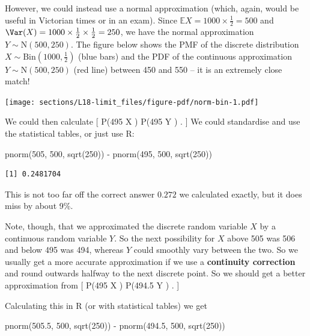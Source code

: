 \documentclass[
  letterpaper,
  DIV=11,
  numbers=noendperiod]{scrreprt}
\newenvironment{Shaded}{\begin{snugshade}}{\end{snugshade}}
\newcommand{\DecValTok}[1]{\textcolor[rgb]{0.68,0.00,0.00}{#1}}
\newcommand{\FloatTok}[1]{\textcolor[rgb]{0.68,0.00,0.00}{#1}}
\newcommand{\FunctionTok}[1]{\textcolor[rgb]{0.28,0.35,0.67}{#1}}
\newcommand{\NormalTok}[1]{\textcolor[rgb]{0.00,0.23,0.31}{#1}}
\newcommand{\SpecialCharTok}[1]{\textcolor[rgb]{0.37,0.37,0.37}{#1}}
\theoremstyle{remark}
\begin{document}
However, we could instead use a normal approximation (which, again,
would be useful in Victorian times or in an exam). Since
\(\mathbb EX = 1000 \times \frac12 = 500\) and
\(\Var(X) = 1000 \times \frac12 \times \frac12 = 250\), we have the
normal approximation \(Y \sim \mathrm N(500, 250)\). The figure below
shows the PMF of the discrete distribution
\(X \sim \mathrm{Bin}(1000, \frac12)\) (blue bars) and the PDF of the
continuous approximation \(Y\sim \mathrm N(500, 250)\) (red line)
between 450 and 550 -- it is an extremely close match!

\texttt{[image: sections/L18-limit\_files/figure-pdf/norm-bin-1.pdf]}

We could then calculate {[} \mathbb P(495 \leq X )
\approx \mathbb P(495 \leq Y ) . {]} We could standardise and
use the statistical tables, or just use R:

\begin{Shaded}
\begin{Highlighting}[]
\FunctionTok{pnorm}\NormalTok{(}\DecValTok{505}\NormalTok{, }\DecValTok{500}\NormalTok{, }\FunctionTok{sqrt}\NormalTok{(}\DecValTok{250}\NormalTok{)) }\SpecialCharTok{{-}} \FunctionTok{pnorm}\NormalTok{(}\DecValTok{495}\NormalTok{, }\DecValTok{500}\NormalTok{, }\FunctionTok{sqrt}\NormalTok{(}\DecValTok{250}\NormalTok{))}
\end{Highlighting}
\end{Shaded}

\begin{verbatim}
[1] 0.2481704
\end{verbatim}

This is not too far off the correct answer \(0.272\) we calculated
exactly, but it does miss by about 9\%.

Note, though, that we approximated the discrete random variable \(X\) by
a continuous random variable \(Y\). So the next possibility for \(X\)
above 505 was 506 and below 495 was 494, whereas \(Y\) could smoothly
vary between the two. So we usually get a more accurate approximation if
we use a \textbf{continuity correction} and round outwards halfway to
the next discrete point. So we should get a better approximation from
{[} \mathbb P(495 \leq X ) \approx \mathbb P(494.5 \leq Y
) . {]}

Calculating this in R (or with statistical tables) we get

\begin{Shaded}
\begin{Highlighting}[]
\FunctionTok{pnorm}\NormalTok{(}\FloatTok{505.5}\NormalTok{, }\DecValTok{500}\NormalTok{, }\FunctionTok{sqrt}\NormalTok{(}\DecValTok{250}\NormalTok{)) }\SpecialCharTok{{-}} \FunctionTok{pnorm}\NormalTok{(}\FloatTok{494.5}\NormalTok{, }\DecValTok{500}\NormalTok{, }\FunctionTok{sqrt}\NormalTok{(}\DecValTok{250}\NormalTok{))}
\end{Highlighting}
\end{Shaded}
\end{document}
